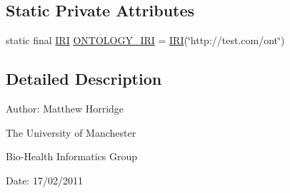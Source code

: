 \subsection*{Static Private Attributes}
\begin{DoxyCompactItemize}
\item 
static final \hyperlink{classorg_1_1semanticweb_1_1owlapi_1_1model_1_1_i_r_i}{I\-R\-I} \hyperlink{classorg_1_1semanticweb_1_1owlapi_1_1api_1_1test_1_1ontology_1_1_mapperless_ontology_manager_test_case_abb270a30c3dcb5b4631672eb264f20db}{O\-N\-T\-O\-L\-O\-G\-Y\-\_\-\-I\-R\-I} = \hyperlink{classorg_1_1semanticweb_1_1owlapi_1_1model_1_1_i_r_i}{I\-R\-I}(\char`\"{}http\-://test.\-com/ont\char`\"{})
\end{DoxyCompactItemize}


\subsection{Detailed Description}
Author\-: Matthew Horridge\par
 The University of Manchester\par
 Bio-\/\-Health Informatics Group\par
 Date\-: 17/02/2011 

